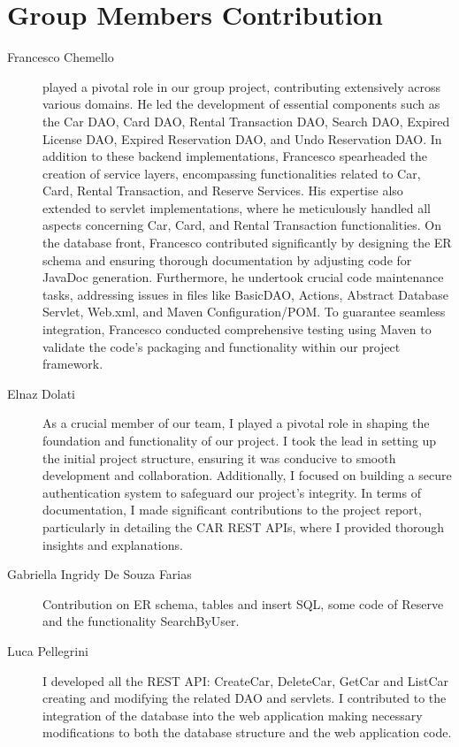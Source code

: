 \section{Group Members Contribution}


\begin{description}
	\item[Francesco Chemello
] played a pivotal role in our group project, contributing extensively across various domains. He led the development of essential components such as the Car DAO, Card DAO, Rental Transaction DAO, Search DAO, Expired License DAO, Expired Reservation DAO, and Undo Reservation DAO. In addition to these backend implementations, Francesco spearheaded the creation of service layers, encompassing functionalities related to Car, Card, Rental Transaction, and Reserve Services. His expertise also extended to servlet implementations, where he meticulously handled all aspects concerning Car, Card, and Rental Transaction functionalities. On the database front, Francesco contributed significantly by designing the ER schema and ensuring thorough documentation by adjusting code for JavaDoc generation. Furthermore, he undertook crucial code maintenance tasks, addressing issues in files like BasicDAO, Actions, Abstract Database Servlet, Web.xml, and Maven Configuration/POM. To guarantee seamless integration, Francesco conducted comprehensive testing using Maven to validate the code's packaging and functionality within our project framework.
	\item[Elnaz Dolati]As a crucial member of our team, I played a pivotal role in shaping the foundation and functionality of our project. I took the lead in setting up the initial project structure, ensuring it was conducive to smooth development and collaboration. Additionally, I focused on building a secure authentication system to safeguard our project's integrity. In terms of documentation, I made significant contributions to the project report, particularly in detailing the CAR REST APIs, where I provided thorough insights and explanations.
	\item[Gabriella Ingridy De Souza Farias
	] Contribution on ER schema, tables and insert SQL, some code of Reserve and the functionality SearchByUser.
	\item[Luca Pellegrini
]I developed all the REST API: CreateCar, DeleteCar, GetCar and ListCar creating and modifying the related DAO and servlets. I contributed to the integration of the database into the web application making necessary modifications to both the database structure and the web application code.

\end{description}
